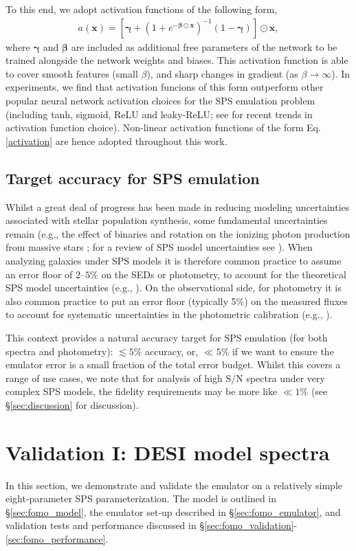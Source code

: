 \documentclass[twocolumn]{aastex62}
\begin{document}
To this end, we adopt activation functions of the following form,
\begin{align}
\label{activation}
    a(\mathbf{x}) = \left[\boldsymbol{\gamma} + (1+e^{-\boldsymbol\beta\odot\mathbf{x}})^{-1}(1-\boldsymbol{\gamma})\right]\odot\mathbf{x},
\end{align}
where $\boldsymbol{\gamma}$ and $\boldsymbol\beta$ are included as additional free parameters of the network to be trained alongside the network weights and biases. This activation function is able to cover smooth features (small $\beta$), and sharp changes in gradient (as $\beta\rightarrow\infty$). In experiments, we find that activation funcions of this form outperform other popular neural network activation choices for the SPS emulation problem (including tanh, sigmoid, ReLU and leaky-ReLU; see \citealp{Nwankpa2018} for recent trends in activation function choice). Non-linear activation functions of the form Eq. \eqref{activation} are hence adopted throughout this work.
%
\subsection{Target accuracy for SPS emulation}
%
Whilst a great deal of progress has been made in reducing modeling uncertainties associated with stellar population synthesis, some fundamental uncertainties remain (e.g., the effect of binaries and rotation on the ionizing photon production from massive stars \citealp{choi2017}; for a review of SPS model uncertainties see \citealp{conroy2013}). When analyzing galaxies under SPS models it is therefore common practice to assume an error floor of $2$--$5\%$ on the SEDs or photometry, to account for the theoretical SPS model uncertainties (e.g., \citealp{leja2019}). On the observational side, for photometry it is also common practice to put an error floor (typically 5\%) on the measured fluxes to account for systematic uncertainties in the photometric calibration (e.g., \citealp{Muzzin2013a, Chevallard2016, Pacifici2016, Belli2019, Carnall2019}).

This context provides a natural accuracy target for SPS emulation (for both spectra and photometry): $\lesssim 5\%$ accuracy, or, $\ll 5\%$ if we want to ensure the emulator error is a small fraction of the total error budget. Whilst this covers a range of use cases, we note that for analysis of high S/N spectra under very complex SPS models, the fidelity requirements may be more like $\ll 1\%$ (see \S \ref{sec:discussion} for discussion).
%
\section{Validation I: DESI model spectra}
\label{sec:fomo}
%
In this section, we demonstrate and validate the emulator on a relatively simple eight-parameter SPS parameterization. The model is outlined in \S \ref{sec:fomo_model}, the emulator set-up described in \S \ref{sec:fomo_emulator}, and validation tests and performance discussed in \S \ref{sec:fomo_validation}-\ref{sec:fomo_performance}.
%
\end{document}
